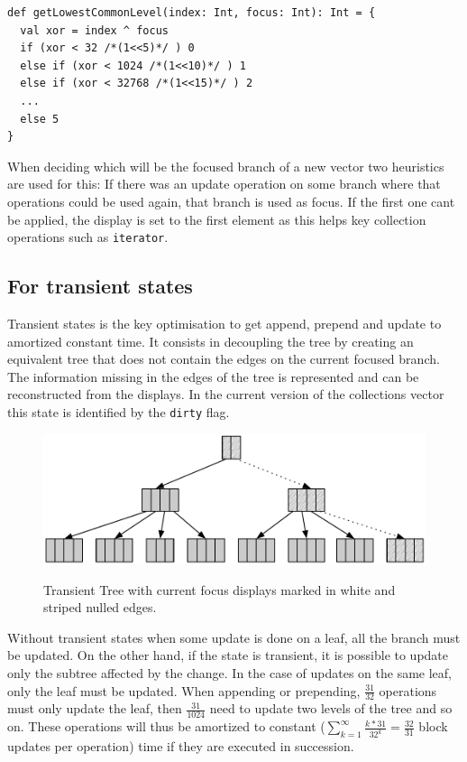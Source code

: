 \begin{lstlisting}[frame=single]
def getLowestCommonLevel(index: Int, focus: Int): Int = {
  val xor = index ^ focus
  if (xor < 32 /*(1<<5)*/ ) 0
  else if (xor < 1024 /*(1<<10)*/ ) 1
  else if (xor < 32768 /*(1<<15)*/ ) 2
  ...
  else 5
}
\end{lstlisting}

When deciding which will be the focused branch of a new vector two heuristics are used for this: If there was an update operation on some branch where that operations could be used again, that branch is used as focus. If the first one cant be applied, the display is set to the first element as this helps key collection operations such as \texttt{iterator}.


\subsection{For transient states}
Transient states is the key optimisation to get append, prepend and update to amortized constant time. It consists in decoupling the tree by creating an equivalent tree that does not contain the edges on the current focused branch. The information missing in the edges of the tree is represented and can be reconstructed from the displays. In the current version of the collections vector \cite{scalaVector211} this state is identified by the \texttt{dirty} flag.

\begin{figure}[h!]
  \centering
  \includegraphics[width=\textwidth]{Figures/Transient_state}
  \label{Transient_state}
  \caption{Transient Tree with current focus displays marked in white and striped nulled edges.}
\end{figure}

Without transient states when some update is done on a leaf, all the branch must be updated. On the other hand, if the state is transient, it is possible to update only the subtree affected by the change. In the case of updates on the same leaf, only the leaf must be updated. When appending or prepending, $\frac{31}{32}$ operations must only update the leaf, then $\frac{31}{1024}$ need to update two levels of the tree and so on. These operations will thus be amortized to constant ($\sum_{k=1}^{\infty} \frac{k*31}{32^k} = \frac{32}{31}$ block updates per operation) time if they are executed in succession.

